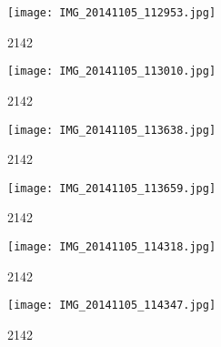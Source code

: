 \documentclass{article}
\begin{document}
\begin{figure}
  \centering
  \texttt{[image: IMG\_20141105\_112953.jpg]}
  \caption{2142}
  \label{fig:2142}
\end{figure}
\begin{figure}
  \centering
  \texttt{[image: IMG\_20141105\_113010.jpg]}
  \caption{2142}
  \label{fig:2142}
\end{figure}
\begin{figure}
  \centering
  \texttt{[image: IMG\_20141105\_113638.jpg]}
  \caption{2142}
  \label{fig:2142}
\end{figure}
\begin{figure}
  \centering
  \texttt{[image: IMG\_20141105\_113659.jpg]}
  \caption{2142}
  \label{fig:2142}
\end{figure}
\begin{figure}
  \centering
  \texttt{[image: IMG\_20141105\_114318.jpg]}
  \caption{2142}
  \label{fig:2142}
\end{figure}
\begin{figure}
  \centering
  \texttt{[image: IMG\_20141105\_114347.jpg]}
  \caption{2142}
  \label{fig:2142}
\end{figure}
\end{document}
